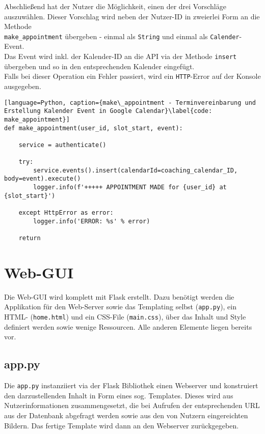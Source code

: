                 Abschließend hat der Nutzer die Möglichkeit, einen der drei Vorschläge auszuwählen. Dieser Vorschlag wird neben der Nutzer-ID in zweierlei Form an die Methode \\\verb|make_appointment| übergeben - einmal als \verb|String| und einmal als \verb|Calender|-Event. \\
                Das Event wird inkl. der Kalender-ID an die API via der Methode \verb|insert| übergeben und so in den entsprechenden Kalender eingefügt. \\
                Falls bei dieser Operation ein Fehler passiert, wird ein \verb|HTTP|-Error auf der Konsole ausgegeben.

                \begin{lstlisting}[language=Python, caption={make\_appointment - Terminvereinbarung und Erstellung Kalender Event in Google Calendar}\label{code: make_appointment}]
def make_appointment(user_id, slot_start, event):

    service = authenticate()

    try:
        service.events().insert(calendarId=coaching_calendar_ID, body=event).execute()
        logger.info(f'+++++ APPOINTMENT MADE for {user_id} at {slot_start}')

    except HttpError as error:
        logger.info('ERROR: %s' % error)

    return
                \end{lstlisting}

    
    \section{Web-GUI}
        Die Web-GUI wird komplett mit Flask erstellt. Dazu benötigt werden die Applikation für den Web-Server sowie das Templating selbst (\verb|app.py|), ein HTML- (\verb|home.html|) und ein CSS-File (\verb|main.css|), über das Inhalt und Style definiert werden sowie wenige Ressourcen. Alle anderen Elemente liegen bereits vor.
        
        \subsection{app.py} \label{app.py}
            Die \verb|app.py| instanziiert via der Flask Bibliothek einen Webserver und konstruiert den darzustellenden Inhalt in Form eines sog. Templates. Dieses wird aus Nutzerinformationen zusammengesetzt, die bei Aufrufen der entsprechenden URL aus der Datenbank abgefragt werden sowie aus den von Nutzern eingereichten Bildern. 
            Das fertige Template wird dann an den Webserver zurückgegeben.

